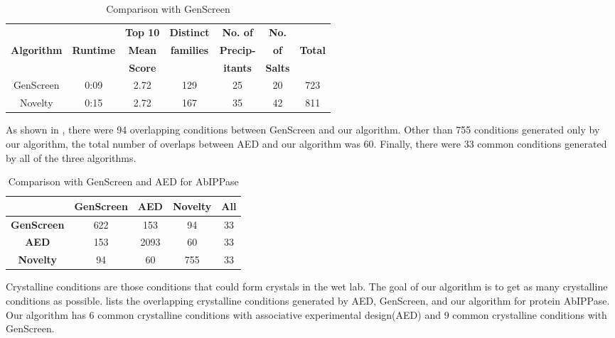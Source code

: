 \begin{table}[htbp]
\begin{center}
\caption{Comparison with GenScreen}
\begin{tabular}{|c|c|c|c|c|c|c|}
\hline
\textbf{} & \textbf{} & \textbf{Top 10} & \textbf{Distinct} & \textbf{No. of} & \textbf{No.} & \textbf{} \\
\textbf{Algorithm} & \textbf{Runtime} & \textbf{Mean} & \textbf{families} & \textbf{Precip-} & \textbf{of} & \textbf{Total} \\
\textbf{} & \textbf{} & \textbf{Score} & \textbf{} & \textbf{itants} & \textbf{Salts} & \textbf{} \\
\hline
GenScreen & 0:09 & 2.72 & 129 & 25 & 20 & 723 \\
\hline
Novelty & 0:15 & 2.72 & 167 & 35 & 42 & 811 \\
\hline
\end{tabular}
\label{scores_table}
\end{center}
\end{table}


As shown in , there were 94 overlapping conditions between GenScreen and our algorithm. Other than 755 conditions generated only by our algorithm, the total number of overlaps between AED and our algorithm was 60. Finally, there were 33 common conditions generated by all of the three algorithms.

\begin{table}[htbp]
\begin{center}
\caption{Comparison with GenScreen and AED for AbIPPase}
\begin{tabular}{|c|c|c|c|c|}
\hline
 & \textbf{GenScreen} & \textbf{AED} & \textbf{Novelty} & \textbf{All} \\
\hline
\textbf{GenScreen} & 622 & 153 & 94 & 33 \\
\hline
\textbf{AED} & 153 & 2093 & 60 & 33 \\
\hline
\textbf{Novelty} & 94 & 60 & 755 & 33 \\
\hline
\end{tabular}
\label{aed_table}
\end{center}
\end{table}

Crystalline conditions are those conditions that could form crystals in the wet lab. The goal of our algorithm is to get as many crystalline conditions as possible.  lists the overlapping crystalline conditions generated by AED, GenScreen, and our algorithm for protein AbIPPase. Our algorithm has 6 common crystalline conditions with associative experimental design(AED) and 9 common crystalline conditions with GenScreen.

